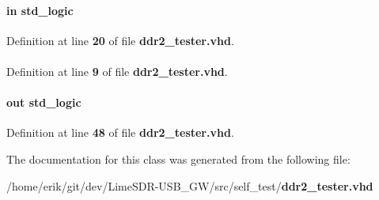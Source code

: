 \paragraph[{soft\+\_\+reset\+\_\+n}]{ {\bfseries \textcolor{keywordflow}{in}\textcolor{vhdlchar}{ }} {\bfseries \textcolor{comment}{std\+\_\+logic}\textcolor{vhdlchar}{ }} \hspace{0.3cm}{\ttfamily [Port]}}\label{classddr2__tester_ab97bd67454580af8752de9e783c8e288}


Definition at line {\bf 20} of file {\bf ddr2\+\_\+tester.\+vhd}.

\paragraph[{std\+\_\+logic\+\_\+1164}]{\hspace{0.3cm}{\ttfamily [Package]}}\label{classddr2__tester_acd03516902501cd1c7296a98e22c6fcb}


Definition at line {\bf 9} of file {\bf ddr2\+\_\+tester.\+vhd}.

\paragraph[{test\+\_\+complete}]{ {\bfseries \textcolor{keywordflow}{out}\textcolor{vhdlchar}{ }} {\bfseries \textcolor{comment}{std\+\_\+logic}\textcolor{vhdlchar}{ }} \hspace{0.3cm}{\ttfamily [Port]}}\label{classddr2__tester_acf1984f76c7a6676510f3d7774e724cd}


Definition at line {\bf 48} of file {\bf ddr2\+\_\+tester.\+vhd}.



The documentation for this class was generated from the following file\+:\begin{DoxyCompactItemize}
\item 
/home/erik/git/dev/\+Lime\+S\+D\+R-\/\+U\+S\+B\+\_\+\+G\+W/src/self\+\_\+test/{\bf ddr2\+\_\+tester.\+vhd}\end{DoxyCompactItemize}
